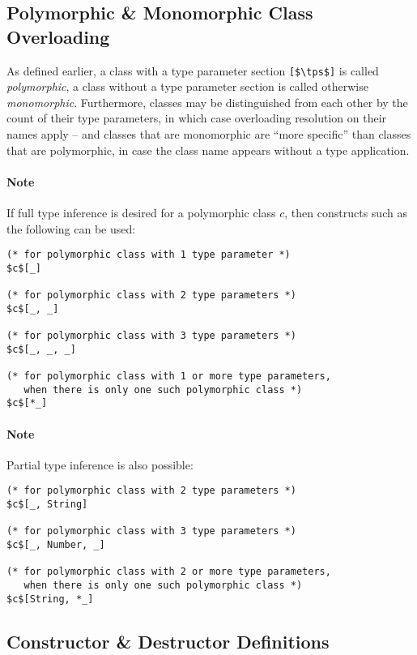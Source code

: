 \subsection{Polymorphic \& Monomorphic Class Overloading}
\label{sec:poly-mono-morphic-classes}

As defined earlier, a class with a type parameter section \lstinline![$\tps$]! is called {\em polymorphic}, a class without a type parameter section is called otherwise {\em monomorphic}. Furthermore, classes may be distinguished from each other by the count of their type parameters, in which case overloading resolution on their names apply -- and classes that are monomorphic are ``more specific'' than classes that are polymorphic, in case the class name appears without a type application.

\paragraph{Note}
If full type inference is desired for a polymorphic class $c$, then constructs such as the following can be used:
\begin{lstlisting}
(* for polymorphic class with 1 type parameter *)
$c$[_] 

(* for polymorphic class with 2 type parameters *)
$c$[_, _] 

(* for polymorphic class with 3 type parameters *)
$c$[_, _, _] 

(* for polymorphic class with 1 or more type parameters,
   when there is only one such polymorphic class *)
$c$[*_]
\end{lstlisting}

\paragraph{Note}
Partial type inference is also possible: 
\begin{lstlisting}
(* for polymorphic class with 2 type parameters *)
$c$[_, String] 

(* for polymorphic class with 3 type parameters *)
$c$[_, Number, _] 

(* for polymorphic class with 2 or more type parameters,
   when there is only one such polymorphic class *)
$c$[String, *_]
\end{lstlisting}





\subsection{Constructor \& Destructor Definitions}
\label{sec:constructor-destructor-def}

